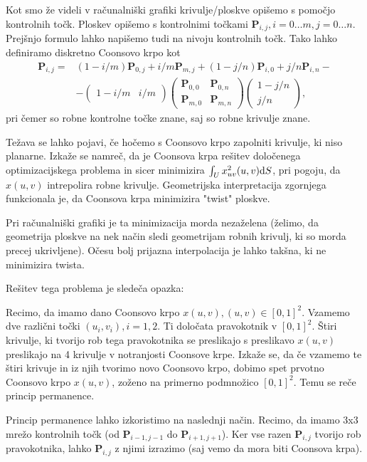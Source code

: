 \documentclass{article}
\begin{document}
Kot smo že videli v računalniški grafiki krivulje/ploskve opišemo s pomočjo kontrolnih točk. Ploskev opišemo s kontrolnimi točkami $\textbf{P}_{i,j}, i= 0 \dots m, j= 0 \dots n$.
Prejšnjo formulo lahko napišemo tudi na nivoju kontrolnih točk. Tako lahko definiramo diskretno Coonsovo krpo kot
\begin{align}
\textbf{P}_{i,j} =& (1-i/m) \textbf{P}_{0,j} + i/m \textbf{P}_{m,j} + (1-j/n) \textbf{P}_{i,0} + j/n \textbf{P}_{i,n} - \nonumber \\ &-
\begin{pmatrix} 1-i/m & i/m \end{pmatrix} \begin{pmatrix} \textbf{P}_{0,0} & \textbf{P}_{0,n} \\ \textbf{P}_{m,0} & \textbf{P}_{m,n} \end{pmatrix}
\begin{pmatrix} 1-j/n \\ j/n \end{pmatrix},
\end{align}
pri čemer so robne kontrolne točke znane, saj so robne krivulje znane.

Težava se lahko pojavi, če hočemo s Coonsovo krpo zapolniti krivulje, ki niso planarne.
Izkaže se namreč, da je Coonsova krpa rešitev določenega optimizacijskega problema in sicer
minimizira $\int_U x_{uv}^2(u,v) \textup{d}S$, pri pogoju, da $x(u,v)$ intrepolira robne krivulje.
Geometrijska interpretacija zgornjega funkcionala je, da Coonsova krpa minimizira "twist" ploskve.

Pri računalniški grafiki je ta minimizacija morda nezaželena (želimo, da geometrija ploskve na nek način sledi geometrijam robnih krivulj, ki so morda precej ukrivljene). Očesu bolj prijazna interpolacija je lahko takšna, ki ne minimizira twista.

Rešitev tega problema je sledeča opazka:

Recimo, da imamo dano Coonsovo krpo $x(u,v), (u,v) \in [0,1]^2$. Vzamemo dve različni točki $(u_i, v_i), i=1,2$. Ti določata pravokotnik v $[0,1]^2$. Štiri krivulje, ki tvorijo rob tega pravokotnika se preslikajo s preslikavo $x(u,v)$ preslikajo na 4 krivulje v notranjosti Coonsove krpe. Izkaže se, da če vzamemo te štiri krivuje in iz njih tvorimo novo Coonsovo krpo, dobimo spet prvotno Coonsovo krpo $x(u,v)$, zoženo na primerno podmnožico $[0,1]^2$. Temu se reče princip permanence.

Princip permanence lahko izkoristimo na naslednji način. Recimo, da imamo 3x3 mrežo kontrolnih točk (od $\textbf{P}_{i-1,j-1}$ do $\textbf{P}_{i+1,j+1}$).
Ker vse razen $\textbf{P}_{i,j}$ tvorijo rob pravokotnika, lahko $\textbf{P}_{i,j}$ z njimi izrazimo (saj vemo da mora biti Coonsova krpa).
\end{document}
